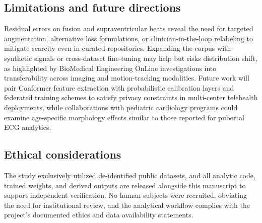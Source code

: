 \subsection{Limitations and future directions}
Residual errors on fusion and supraventricular beats reveal the need for targeted augmentation, alternative loss formulations, or clinician-in-the-loop relabeling to mitigate scarcity even in curated repositories. Expanding the corpus with synthetic signals or cross-dataset fine-tuning may help but risks distribution shift, as highlighted by BioMedical Engineering OnLine investigations into transferability across imaging and motion-tracking modalities.\cite{Chen2024SuperResolution,Sugiarto2025GroundReaction,Li2025Antioxidant} Future work will pair Conformer feature extraction with probabilistic calibration layers and federated training schemes to satisfy privacy constraints in multi-center telehealth deployments, while collaborations with pediatric cardiology programs could examine age-specific morphology effects similar to those reported for pubertal ECG analytics.\cite{Osullivan2024Pediatric}

\subsection{Ethical considerations}
The study exclusively utilized de-identified public datasets, and all analytic code, trained weights, and derived outputs are released alongside this manuscript to support independent verification. No human subjects were recruited, obviating the need for institutional review, and the analytical workflow complies with the project’s documented ethics and data availability statements.
